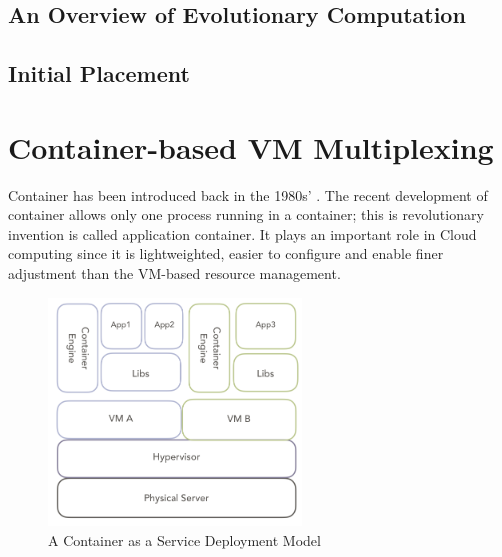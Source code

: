 \subsection*{An Overview of Evolutionary Computation}


\subsection*{Initial Placement}

\section*{Container-based VM Multiplexing}
Container has been introduced back in the 1980s' \cite{}. The recent development of container
allows only one process running in a container; this is revolutionary invention is called application
container. It plays an important role in Cloud computing since it is lightweighted, easier to configure
and enable finer adjustment than the VM-based resource management.


\begin{figure}
	\centering
	\includegraphics[width=0.6\textwidth]{pics/container.png}
	\caption{A Container as a Service Deployment Model}
	\label{fig:container}
\end{figure}




